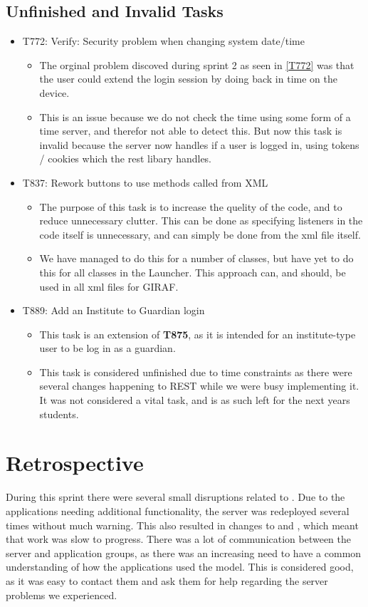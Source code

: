 \subsection{Unfinished and Invalid Tasks}\label{S4Invalid}
\begin{itemize}
  \item T772: Verify: Security problem when changing system date/time
  	\begin{itemize}
  		\item The orginal problem discoved during sprint 2 as seen in \autoref{T772}
 		was that the user could extend the login session by doing back in time on the
  		device.
		\item This is an issue because we do not check the time using some form of a
		time server, and therefor not able to detect this.  
		But now this task is invalid because the server now handles if a user is
		logged in, using tokens / cookies which the rest libary handles.
		\end{itemize}
  \item T837: Rework buttons to use methods called from XML
	\begin{itemize}
	  \item The purpose of this task is to increase the quelity of the code, and to
	  reduce unnecessary clutter. This can be done as specifying listeners in the
	  code itself is unnecessary, and can simply be done from the xml file itself.
	  \item We have managed to do this for a number of classes, but have yet to
	  do this for all classes in the Launcher. This approach can, and should, be
	  used in all xml files for GIRAF.
	  \end{itemize}
  \item T889: Add an Institute to Guardian login
   \begin{itemize}
     \item This task is an extension of \textbf{T875}, as it is intended for an
     institute-type user to be log in as a guardian. 
     \item This task is considered unfinished due to time constraints as there
     were several changes happening to REST while we were busy implementing it.
     It was not considered a vital task, and is as such left for the next years
     students.
   \end{itemize}
\end{itemize}

\section{Retrospective}
During this sprint there were several small disruptions related to .
Due to the applications needing additional functionality, the server was
redeployed several times without much warning. This also resulted in changes to
 and , which meant that work was
slow to progress. There was a lot of communication between the
server and application groups, as there was an increasing need to have a common
understanding of how the applications used the model. This is considered good,
as it was easy to contact them and ask them for help regarding the server
problems we experienced.\nl


